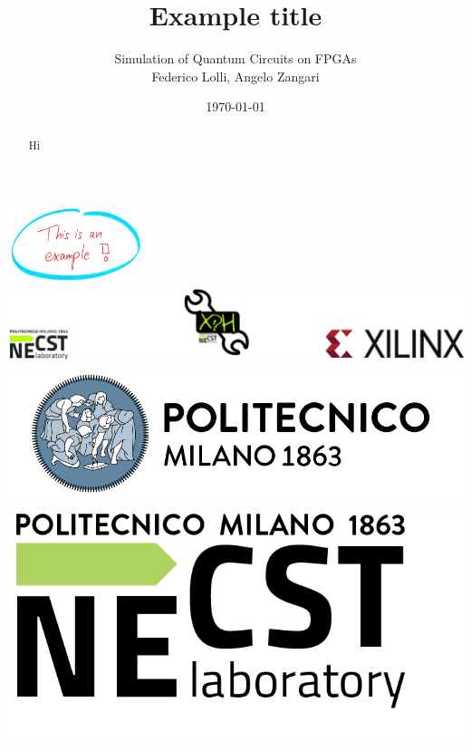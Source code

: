 \documentclass[12pt,oneside,a4paper]{article}
\title{\textbf{Example title}}
\author{Simulation of Quantum Circuits on FPGAs\\Federico Lolli, Angelo Zangari}
\date{\today}
\begin{document}
\begin{titlepage}
    \centering
    \clearpage
    \maketitle
	\thispagestyle{empty}
	\vspace*{1cm}
	\includegraphics[width=4cm]{example.jpg} %
	\vfill
	\centering
	\includegraphics{footer.png}
	\includegraphics{logo_polimi.png}\includegraphics{logo_NECST.png}
\end{titlepage}

\begin{abstract}
Hi
\end{abstract}
\end{document}
